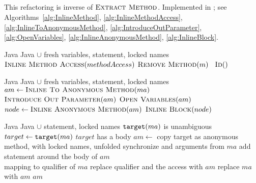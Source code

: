 \subsection{}
This refactoring is inverse of $\textsc{Extract Method}$. Implemented in ; 
see Algorithms~\ref{alg:InlineMethod}, \ref{alg:InlineMethodAccess}, \ref{alg:InlineToAnonymousMethod}, %
\ref{alg:IntroduceOutParameter}, %
\ref{alg:OpenVariables}, \ref{alg:InlineAnonymousMethod}, \ref{alg:InlineBlock}.


\begin{algorithm}[p]
\caption{$\refactoring{Inline Method}(m \colon \type{Method})$}
\label{alg:InlineMethod}
\begin{algorithmic}[1]
\REQUIRE Java
\ENSURE Java $\cup$ fresh variables,  statement, locked names
\medskip
    \STATE $\textsc{Inline Method Access}(methodAccess)$
  \ENDFOR
  \STATE $\textsc{Remove Method}(m)$ \orelse\ $\textsc{Id}()$
\end{algorithmic}
\end{algorithm}


\begin{algorithm}[p]
\caption{$\refactoring{Inline Method Access}(ma \colon \type{MethodAccess})$}
\label{alg:InlineMethodAccess}
\begin{algorithmic}[1]
\REQUIRE Java
\ENSURE Java $\cup$ fresh variables,  statement, locked names
\medskip
  \STATE $am \leftarrow \textsc{Inline To Anonymous Method}(ma)$
  \STATE $\textsc{Introduce Out Parameter}(am)$
  \STATE $\textsc{Open Variables}(am)$
  \STATE $node \leftarrow \textsc{Inline Anonymous Method}(am)$
    \STATE $\textsc{Inline Block}(node)$
  \ENDIF
\end{algorithmic}
\end{algorithm}


\begin{algorithm}[p]
\caption{$\refactoring{Inline To Anonymous Method}(am \colon \type{MethodAccess}) : \type{AnonymousMethod}$}
\label{alg:InlineToAnonymousMethod}
\begin{algorithmic}[1]
\REQUIRE Java
\ENSURE Java $\cup$  statement, locked names
\medskip
  \STATE \assert $\text{\texttt{target}}(ma)$ is unambiguous
  \STATE $target \leftarrow \text{\texttt{target}}(ma)$
  \STATE \assert $target$ has a body
  \STATE $am \leftarrow$ copy target as anonymous method, with locked names, 
  			unfolded synchronize and arguments from $ma$
    \STATE add  statement around the body of $am$ \\ mapping  to qualifier of $ma$
    \STATE replace qualifier and the access with $am$
  \ELSE
    \STATE replace $ma$ with $am$
  \ENDIF
  \RETURN $am$
\end{algorithmic}
\end{algorithm}

